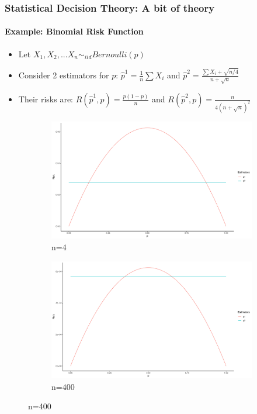 \documentclass[
  shownotes,
  xcolor={svgnames},
  hyperref={colorlinks,citecolor=DarkBlue,linkcolor=DarkRed,urlcolor=DarkBlue}
  , aspectratio=169]{beamer}
\begin{document}
\begin{frame}
\frametitle{Statistical Decision Theory: A bit of theory}
\framesubtitle{Example: Binomial Risk Function}

\begin{itemize}
  \footnotesize
  \item Let $X_1,X_2,...X_n \sim_{iid} Bernoulli(p)$
  \item Consider 2 estimators for $p$:  $\hat{p}^1=\frac{1}{n}\sum X_i$ and $\hat{p}^2=\frac{\sum X_i + \sqrt{n/4}}{n+\sqrt{n}}$
  \item Their risks are: $R(\hat{p}^1,p)=\frac{p(1-p)}{n}$ and $R(\hat{p}^2,p)=\frac{n}{4(n+\sqrt{n})^2}$
\end{itemize}


\begin{figure}
\centering
\begin{subfigure}{.5\textwidth}
  \centering
  \includegraphics[scale=0.23]{figures/fig_2a.pdf}
  \caption{n=4}
\end{subfigure}%
\begin{subfigure}{.5\textwidth}
  \centering
  \includegraphics[scale=0.23]{figures/fig_2b.pdf}
  \caption{n=400}
\end{subfigure}
\end{figure}



\end{frame}
\end{document}
